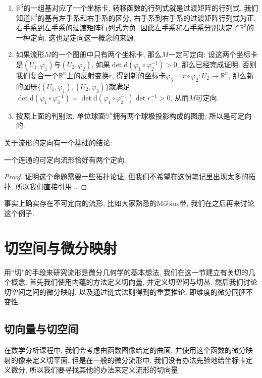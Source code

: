 \begin{eg}
    \begin{enumerate}[(1)]
        \item $\mathbb{R}^3$的一组基对应了一个坐标卡, 转移函数的行列式就是过渡矩阵的行列式.
        我们知道$\mathbb{R}^3$的基有左手系和右手系的区分, 右手系到右手系的过渡矩阵行列式为正, 右手系到左手系的过渡矩阵行列式为负.
        因此左手系和右手系分别决定了$\mathbb{R}^3$的一种定向, 这也是定向这一概念的来源.
        \item 如果流形$M$的一个图册中只有两个坐标卡, 那么$M$一定可定向:
        设这两个坐标卡是$(U_1,\varphi_1)$与$(U_2,\varphi_2)$, 如果$\det\mathrm{d}(\varphi_1\circ\varphi_2^{-1})>0$, 那么已经完成证明;
        否则我们复合一个$\mathbb{R}^n$上的反射变换$r$, 得到新的坐标卡$\varphi_3=r\circ\varphi_2:U_2\to\mathbb{R}^n$, 那么新的图册$\{(U_1,\varphi_1),(U_2,\varphi_3)\}$就满足$\det\mathrm{d}(\varphi_1\circ\varphi_3^{-1})=\det\mathrm{d}(\varphi_1\circ\varphi_2^{-1})\det{r^{-1}}>0$, 从而$M$可定向.
        \item 按照上面的判别法, 单位球面$\mathbb{S}^n$拥有两个球极投影构成的图册, 所以是可定向的.
    \end{enumerate}
\end{eg}

关于流形的定向有一个基础的结论:

\begin{prop}
    一个连通的可定向流形恰好有两个定向.
\end{prop}

\begin{proof}
    证明这个命题需要一些拓扑论证, 但我们不希望在这份笔记里出现太多的拓扑, 所以我们直接引用~\parencite[引理1.1.2]{Mei_Manifold}.
\end{proof}

事实上确实存在不可定向的流形, 比如大家熟悉的M\"{o}bius带, 我们在之后再来讨论这个例子.

\section{切空间与微分映射}
用``切''的手段来研究流形是微分几何学的基本想法, 我们在这一节建立有关切的几个概念.
首先我们使用内蕴的方法定义切向量, 并定义切空间与切丛.
然后我们讨论切空间之间的微分映射, 以及通过链式法则得到的重要推论, 即维度的微分同胚不变性.

\subsection*{切向量与切空间}
在数学分析课程中, 我们会考虑由函数图像给定的曲面, 并使用这个函数的微分映射的像来定义切平面.
但是在一般的微分流形中, 我们没有办法先验地给坐标卡定义微分, 所以我们要寻找其他的办法来定义流形的切向量.

